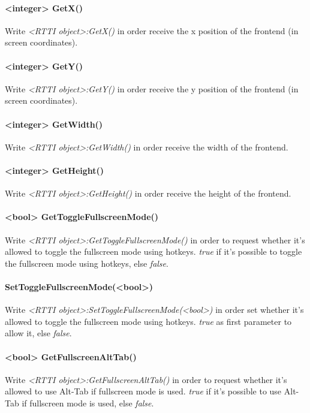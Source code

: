 \paragraph{<integer> GetX()}
Write \emph{<RTTI object>:GetX()} in order receive the x position of the frontend (in screen coordinates).

\paragraph{<integer> GetY()}
Write \emph{<RTTI object>:GetY()} in order receive the y position of the frontend (in screen coordinates).

\paragraph{<integer> GetWidth()}
Write \emph{<RTTI object>:GetWidth()} in order receive the width of the frontend.

\paragraph{<integer> GetHeight()}
Write \emph{<RTTI object>:GetHeight()} in order receive the height of the frontend.

\paragraph{<bool> GetToggleFullscreenMode()}
Write \emph{<RTTI object>:GetToggleFullscreenMode()} in order to request whether it's allowed to toggle the fullscreen mode using hotkeys. \emph{true} if it's possible to toggle the fullscreen mode using hotkeys, else \emph{false}.

\paragraph{SetToggleFullscreenMode(<bool>)}
Write \emph{<RTTI object>:SetToggleFullscreenMode(<bool>)} in order set whether it's allowed to toggle the fullscreen mode using hotkeys. \emph{true} as first parameter to allow it, else \emph{false}.

\paragraph{<bool> GetFullscreenAltTab()}
Write \emph{<RTTI object>:GetFullscreenAltTab()} in order to request whether it's allowed to use Alt-Tab if fullscreen mode is used. \emph{true} if it's possible to use Alt-Tab if fullscreen mode is used, else \emph{false}.

